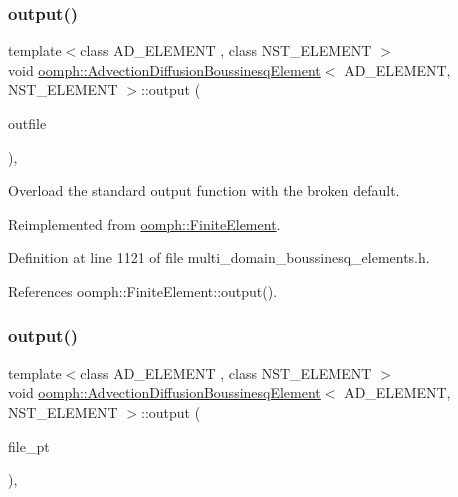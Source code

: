 \subsubsection{\texorpdfstring{output()}{output()}\hspace{0.1cm}{\footnotesize\ttfamily [2/4]}}
{\footnotesize\ttfamily template$<$class A\+D\+\_\+\+E\+L\+E\+M\+E\+NT , class N\+S\+T\+\_\+\+E\+L\+E\+M\+E\+NT $>$ \\
void \hyperlink{classoomph_1_1AdvectionDiffusionBoussinesqElement}{oomph\+::\+Advection\+Diffusion\+Boussinesq\+Element}$<$ A\+D\+\_\+\+E\+L\+E\+M\+E\+NT, N\+S\+T\+\_\+\+E\+L\+E\+M\+E\+NT $>$\+::output (\begin{DoxyParamCaption}\item[{std\+::ostream \&}]{outfile }\end{DoxyParamCaption})\hspace{0.3cm}{\ttfamily [inline]}, {\ttfamily [virtual]}}



Overload the standard output function with the broken default. 



Reimplemented from \hyperlink{classoomph_1_1FiniteElement_a2ad98a3d2ef4999f1bef62c0ff13f2a7}{oomph\+::\+Finite\+Element}.



Definition at line 1121 of file multi\+\_\+domain\+\_\+boussinesq\+\_\+elements.\+h.



References oomph\+::\+Finite\+Element\+::output().

\mbox{\label{classoomph_1_1AdvectionDiffusionBoussinesqElement_adbd60fca6201bc2cd80ff39303323053}} 
\subsubsection{\texorpdfstring{output()}{output()}\hspace{0.1cm}{\footnotesize\ttfamily [3/4]}}
{\footnotesize\ttfamily template$<$class A\+D\+\_\+\+E\+L\+E\+M\+E\+NT , class N\+S\+T\+\_\+\+E\+L\+E\+M\+E\+NT $>$ \\
void \hyperlink{classoomph_1_1AdvectionDiffusionBoussinesqElement}{oomph\+::\+Advection\+Diffusion\+Boussinesq\+Element}$<$ A\+D\+\_\+\+E\+L\+E\+M\+E\+NT, N\+S\+T\+\_\+\+E\+L\+E\+M\+E\+NT $>$\+::output (\begin{DoxyParamCaption}\item[{F\+I\+LE $\ast$}]{file\+\_\+pt }\end{DoxyParamCaption})\hspace{0.3cm}{\ttfamily [inline]}, {\ttfamily [virtual]}}



